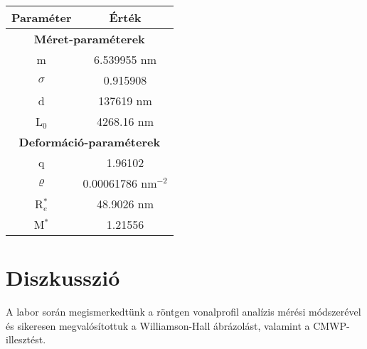 \begin{multicols}{2}
\begin{center}
\begin{tabular}{|c|c|}
\hline
Paraméter & Érték       \\ \hline \hline
\multicolumn{2}{|c|}{\textbf{Méret-paraméterek}} \\ \hline
m              & 6.539955 nm               \\
$\sigma$       & 0.915908                  \\
d              & 137619 nm                 \\
L$_{0}$        & 4268.16 nm                \\ \hline
\multicolumn{2}{|c|}{\textbf{Deformáció-paraméterek}} \\ \hline
q              & 1.96102                   \\
$\varrho$      & 0.00061786 nm$^{-2}$      \\
R$_{e}^{\ast}$ & 48.9026 nm                \\
M$^{\ast}$     & 1.21556                   \\
\hline
\end{tabular}
\end{center}

\section{Diszkusszió}
A labor során megismerkedtünk a röntgen vonalprofil analízis mérési módszerével és sikeresen megvalósítottuk a Williamson-Hall ábrázolást, valamint a CMWP-illesztést.

\end{multicols}